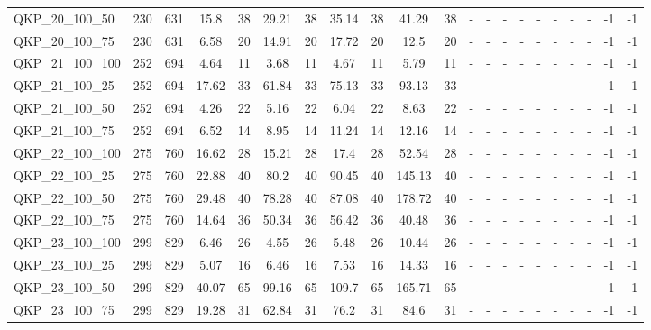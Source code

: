 \begin{sidewaystable}[!ht]
{\begin{tabular}{lcccccccccccccccccccc}
QKP\_20\_100\_50 & 230 & 631 &  \textcolor{blue2}{15.8} & 38 & 29.21 & 38 & 35.14 & 38 & 41.29 & 38 &  - &  - &  - &  - &  - &  - &  - &  - & -1 & -1 \\
QKP\_20\_100\_75 & 230 & 631 &  \textcolor{blue2}{6.58} & 20 & 14.91 & 20 & 17.72 & 20 & 12.5 & 20 &  - &  - &  - &  - &  - &  - &  - &  - & -1 & -1 \\
QKP\_21\_100\_100 & 252 & 694 & 4.64 & 11 &  \textcolor{blue2}{3.68} & 11 & 4.67 & 11 & 5.79 & 11 &  - &  - &  - &  - &  - &  - &  - &  - & -1 & -1 \\
QKP\_21\_100\_25 & 252 & 694 &  \textcolor{blue2}{17.62} & 33 & 61.84 & 33 & 75.13 & 33 & 93.13 & 33 &  - &  - &  - &  - &  - &  - &  - &  - & -1 & -1 \\
QKP\_21\_100\_50 & 252 & 694 &  \textcolor{blue2}{4.26} & 22 & 5.16 & 22 & 6.04 & 22 & 8.63 & 22 &  - &  - &  - &  - &  - &  - &  - &  - & -1 & -1 \\
QKP\_21\_100\_75 & 252 & 694 &  \textcolor{blue2}{6.52} & 14 & 8.95 & 14 & 11.24 & 14 & 12.16 & 14 &  - &  - &  - &  - &  - &  - &  - &  - & -1 & -1 \\
QKP\_22\_100\_100 & 275 & 760 & 16.62 & 28 &  \textcolor{blue2}{15.21} & 28 & 17.4 & 28 & 52.54 & 28 &  - &  - &  - &  - &  - &  - &  - &  - & -1 & -1 \\
QKP\_22\_100\_25 & 275 & 760 &  \textcolor{blue2}{22.88} & 40 & 80.2 & 40 & 90.45 & 40 & 145.13 & 40 &  - &  - &  - &  - &  - &  - &  - &  - & -1 & -1 \\
QKP\_22\_100\_50 & 275 & 760 &  \textcolor{blue2}{29.48} & 40 & 78.28 & 40 & 87.08 & 40 & 178.72 & 40 &  - &  - &  - &  - &  - &  - &  - &  - & -1 & -1 \\
QKP\_22\_100\_75 & 275 & 760 &  \textcolor{blue2}{14.64} & 36 & 50.34 & 36 & 56.42 & 36 & 40.48 & 36 &  - &  - &  - &  - &  - &  - &  - &  - & -1 & -1 \\
QKP\_23\_100\_100 & 299 & 829 & 6.46 & 26 &  \textcolor{blue2}{4.55} & 26 & 5.48 & 26 & 10.44 & 26 &  - &  - &  - &  - &  - &  - &  - &  - & -1 & -1 \\
QKP\_23\_100\_25 & 299 & 829 &  \textcolor{blue2}{5.07} & 16 & 6.46 & 16 & 7.53 & 16 & 14.33 & 16 &  - &  - &  - &  - &  - &  - &  - &  - & -1 & -1 \\
QKP\_23\_100\_50 & 299 & 829 &  \textcolor{blue2}{40.07} & 65 & 99.16 & 65 & 109.7 & 65 & 165.71 & 65 &  - &  - &  - &  - &  - &  - &  - &  - & -1 & -1 \\
QKP\_23\_100\_75 & 299 & 829 &  \textcolor{blue2}{19.28} & 31 & 62.84 & 31 & 76.2 & 31 & 84.6 & 31 &  - &  - &  - &  - &  - &  - &  - &  - & -1 & -1 \\

\end{tabular}}
\end{sidewaystable}
